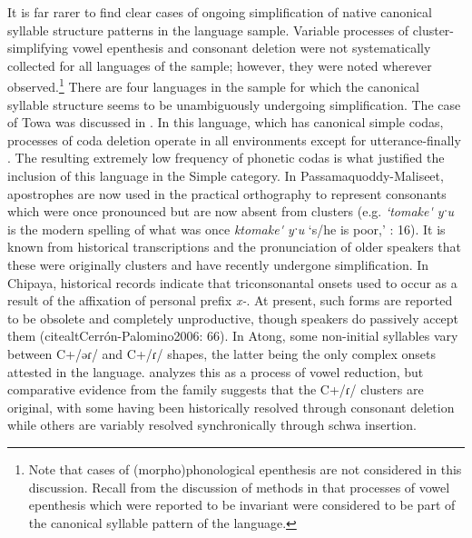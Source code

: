   It is far rarer to find clear cases of ongoing simplification of native canonical syllable structure patterns in the language sample. Variable processes of cluster-simplifying vowel epenthesis and consonant deletion were not systematically collected for all languages of the sample; however, they were noted wherever observed.\footnote{{Note that cases of (morpho)phonological epenthesis are not considered in this discussion. Recall from the discussion of methods in  that processes of vowel epenthesis which were reported to be invariant were considered to be part of the canonical syllable pattern of the language.}} There are four languages in the sample for which the canonical syllable structure seems to be unambiguously undergoing simplification. The case of Towa was discussed in . In this language, which has canonical simple codas, processes of coda deletion operate in all environments except for utterance-finally \citep[22--24]{Yumitani1998}. The resulting extremely low frequency of phonetic codas is what justified the inclusion of this language in the Simple category. In Passamaquoddy-Maliseet, apostrophes are now used in the practical orthography to represent consonants which were once pronounced but are now absent from clusters (e.g. \textit{‘tomake\'{} yˑu} is the modern spelling of what was once \textit{ktomake\'{} yˑu} ‘s/he is poor,’ \citealt{Leavitt1996}: 16). It is known from historical transcriptions and the pronunciation of older speakers that these were originally clusters and have recently undergone simplification. In Chipaya, historical records indicate that triconsonantal onsets used to occur as a result of the affixation of personal prefix \textit{x-}. At present, such forms are reported to be obsolete and completely unproductive, though speakers do passively accept them (citealt{Cerrón-Palomino2006}: 66). In Atong, some non-initial syllables vary between C+/əɾ/ and C+/ɾ/ shapes, the latter being the only complex onsets attested in the language. \citet[30--32]{VanBreugel2008} analyzes this as a process of vowel reduction, but comparative evidence from the family suggests that the C+/ɾ/ clusters are original, with some having been historically resolved through consonant deletion while others are variably resolved synchronically through schwa insertion.


